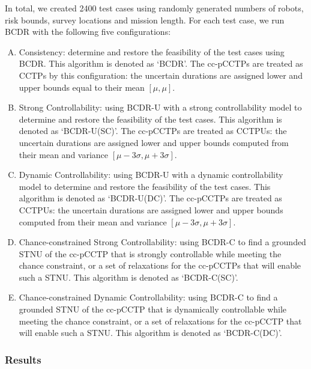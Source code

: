 \documentclass[jair,twoside,11pt,theapa]{article}
\begin{document}
In total, we created 2400 test cases using randomly generated numbers of robots,
risk bounds, survey locations and mission length. For each test case, we run
BCDR with the following five configurations:


\begin{enumerate}[A.]
	\item Consistency: determine and restore the feasibility of the test cases
	using BCDR. This algorithm is denoted as `BCDR'. The cc-pCCTPs are treated as
	CCTPs by this configuration: the uncertain durations are assigned lower and
	upper bounds equal to their mean $[\mu, \mu]$.
	
	\item Strong Controllability: using BCDR-U with a strong controllability model
	to determine and restore the feasibility of the test cases. This algorithm is
	denoted as `BCDR-U(SC)'. The cc-pCCTPs are treated as CCTPUs: the uncertain
	durations are assigned lower and upper bounds computed from their mean and
	variance $[\mu-3\sigma, \mu+3\sigma]$.
	
	\item Dynamic Controllability: using BCDR-U with a dynamic controllability
	model to determine and restore the feasibility of the test cases. This
	algorithm is denoted as `BCDR-U(DC)'. The cc-pCCTPs are treated as CCTPUs: the
	uncertain durations are assigned lower and upper bounds computed from their
	mean and variance $[\mu-3\sigma, \mu+3\sigma]$.
	
	\item Chance-constrained Strong Controllability: using BCDR-C to find a
	grounded STNU of the cc-pCCTP that is strongly controllable while meeting the
	chance constraint, or a set of relaxations for the cc-pCCTPs that will enable
	such a STNU. This algorithm is denoted as `BCDR-C(SC)'.
	
	\item Chance-constrained Dynamic Controllability: using BCDR-C to find a
	grounded STNU of the cc-pCCTP that is dynamically controllable while meeting the
	chance constraint, or a set of relaxations for the cc-pCCTP that will enable
	such a STNU. This algorithm is denoted as `BCDR-C(DC)'.
\end{enumerate}





\subsubsection{Results}
\end{document}
